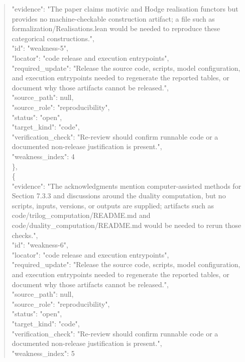 \documentclass[11pt]{article}
\begin{document}
\begin{quote}
      "evidence": "The paper claims motivic and Hodge realisation functors but provides no machine-checkable construction artifact; a file such as formalization/Realisations.lean would be needed to reproduce these categorical constructions.",\\
      "id": "weakness-5",\\
      "locator": "code release and execution entrypoints",\\
      "required\_update": "Release the source code, scripts, model configuration, and execution entrypoints needed to regenerate the reported tables, or document why those artifacts cannot be released.",\\
      "source\_path": null,\\
      "source\_role": "reproducibility",\\
      "status": "open",\\
      "target\_kind": "code",\\
      "verification\_check": "Re-review should confirm runnable code or a documented non-release justification is present.",\\
      "weakness\_index": 4\\
    \},\\
    \{\\
      "evidence": "The acknowledgments mention computer-assisted methods for Section 7.3.3 and discussions around the duality computation, but no scripts, inputs, versions, or outputs are supplied; artifacts such as code/trilog\_computation/README.md and code/duality\_computation/README.md would be needed to rerun those checks.",\\
      "id": "weakness-6",\\
      "locator": "code release and execution entrypoints",\\
      "required\_update": "Release the source code, scripts, model configuration, and execution entrypoints needed to regenerate the reported tables, or document why those artifacts cannot be released.",\\
      "source\_path": null,\\
      "source\_role": "reproducibility",\\
      "status": "open",\\
      "target\_kind": "code",\\
      "verification\_check": "Re-review should confirm runnable code or a documented non-release justification is present.",\\
      "weakness\_index": 5\\

\end{quote}
\end{document}
